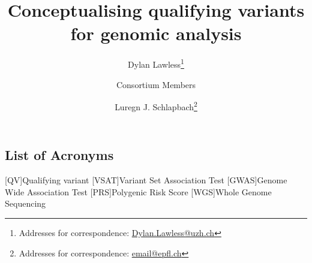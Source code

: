 
\usepackage[printonlyused,withpage,nohyperlinks]{acronym}
% 


\newcommand{\boxlabel}[1]{%
  \refstepcounter{myboxcounter}%
  \label{#1}%
}




\title{Conceptualising qualifying variants for genomic analysis}

\author[1]{Dylan Lawless\thanks{Addresses for correspondence: \href{mailto:Dylan.Lawless@uzh.ch}{Dylan.Lawless@uzh.ch}}}
\author[1]{Consortium Members}
\author[1]{Luregn J. Schlapbach\thanks{Addresses for correspondence: \href{mailto:email@epfl.ch}{email@epfl.ch}}}


\begin{small}
\maketitle
\justify
\tableofcontents

\section{List of Acronyms}
\begin{acronym}
 [QV]{Qualifying variant}
 [VSAT]{Variant Set Association Test}
 [GWAS]{Genome Wide Association Test}
 [PRS]{Polygenic Risk Score}
  [WGS]{Whole Genome Sequencing}
\end{acronym}
\end{small}
 
